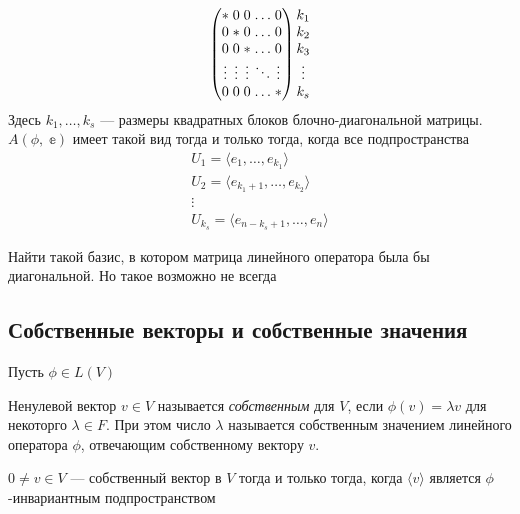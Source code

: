 \begin{Generalization}
     \[\begin{array}{cc}
  \arraycolsep=1.4pt
  \begin{pmatrix}
  * &0 &0 &\ldots &0\\
  0 &* &0 &\ldots &0 \\
  0 &0 &* &\ldots &0 \\
  \vdots &\vdots &\vdots &\ddots &\vdots\\
  0 &0 &0 &\ldots &*
  \end{pmatrix}
  \begin{matrix}
  k_1 \\ k_2 \\ k_3 \\ \vdots \\ k_s
  \end{matrix}
  \end{array}\]
  Здесь $k_1, \ldots, k_s$ --- размеры квадратных блоков блочно-диагональной матрицы. $A(\phi,\; \mathbb{e})$ имеет такой вид тогда и только тогда, когда все подпространства
  \begin{gather*}
      U_1 = \langle e_1, \ldots, e_{k_1}\rangle \\
      U_2 = \langle e_{k_1+1}, \ldots, e_{k_2} \rangle \\
      \vdots\\
      U_{k_s} = \langle e_{n-k_s+1}, \ldots, e_n \rangle
  \end{gather*}
\end{Generalization}
\begin{Thedream}
    Найти такой базис, в котором матрица линейного оператора была бы диагональной. Но такое возможно не всегда
\end{Thedream}

\subsection*{Собственные векторы и собственные значения}

Пусть $\phi\in L(V)$
\begin{Def}
    Ненулевой вектор $v\in V$ называется \textit{собственным} для $V$, если $\phi(v) = \lambda v$ для некоторго $\lambda \in F$. При этом число $\lambda$ называется собственным значением линейного оператора $\phi$, отвечающим собственному вектору $v$.
\end{Def}
\begin{Suggestion}
    $0 \neq v \in V$ --- собственный вектор в $V$ тогда и только тогда, когда $\langle v \rangle$ является $\phi$-инвариантным подпространством
\end{Suggestion}


